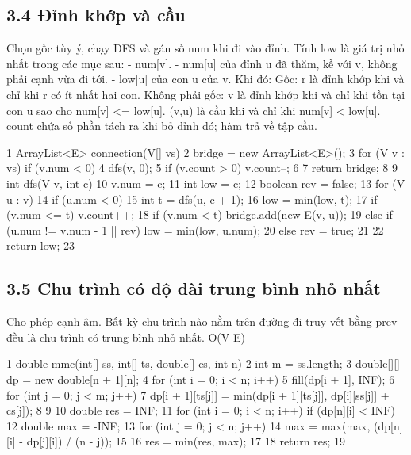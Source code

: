 \documentclass[11pt]{article}
\begin{document}
\subsection{3.4 Đỉnh khớp và cầu}
\begin{NoteBlock}
Chọn gốc tùy ý, chạy DFS và gán số num khi đi vào đỉnh.
Tính low là giá trị nhỏ nhất trong các mục sau:
- num[v].
- num[u] của đỉnh u đã thăm, kề với v, không phải cạnh vừa đi tới.
- low[u] của con u của v.
Khi đó:
Gốc: r là đỉnh khớp khi và chỉ khi r có ít nhất hai con.
Không phải gốc: v là đỉnh khớp khi và chỉ khi tồn tại con u sao cho num[v] <= low[u].
(v,u) là cầu khi và chỉ khi num[v] < low[u].
count chứa số phần tách ra khi bỏ đỉnh đó; hàm trả về tập cầu.
\end{NoteBlock}
\begin{Code}
1 ArrayList<E> connection(V[] vs) {
2 bridge = new ArrayList<E>();
3 for (V v : vs) if (v.num < 0) {
4 dfs(v, 0);
5 if (v.count > 0) v.count--;
6 }
7 return bridge;
8 }
9 int dfs(V v, int c) {
10 v.num = c;
11 int low = c;
12 boolean rev = false;
13 for (V u : v) {
14 if (u.num < 0) {
15 int t = dfs(u, c + 1);
16 low = min(low, t);
17 if (v.num <= t) v.count++;
18 if (v.num < t) bridge.add(new E(v, u));
19 } else if (u.num != v.num - 1 || rev) low = min(low, u.num);
20 else rev = true;
21 }
22 return low;
23 }
\end{Code}
\subsection{3.5 Chu trình có độ dài trung bình nhỏ nhất}
\begin{NoteBlock}
Cho phép cạnh âm.
Bất kỳ chu trình nào nằm trên đường đi truy vết bằng prev đều là chu trình có trung bình nhỏ nhất.
O(V E)
\end{NoteBlock}
\begin{Code}
1 double mmc(int[] ss, int[] ts, double[] cs, int n) {
2 int m = ss.length;
3 double[][] dp = new double[n + 1][n];
4 for (int i = 0; i < n; i++) {
5 fill(dp[i + 1], INF);
6 for (int j = 0; j < m; j++) {
7 dp[i + 1][ts[j]] = min(dp[i + 1][ts[j]], dp[i][ss[j]] + cs[j]);
8 }
9 }
10 double res = INF;
11 for (int i = 0; i < n; i++) if (dp[n][i] < INF) {
12 double max = -INF;
13 for (int j = 0; j < n; j++) {
14 max = max(max, (dp[n][i] - dp[j][i]) / (n - j));
15 }
16 res = min(res, max);
17 }
18 return res;
19 }
\end{Code}
\end{document}
